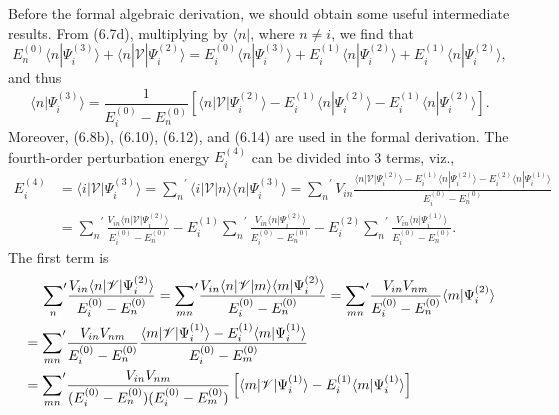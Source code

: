 \documentclass[a4paper]{book}
\newcounter{solution}[chapter]
\begin{document}
\begin{solution}
	Before the formal algebraic derivation, we should obtain some useful intermediate results. From (6.7d), multiplying by $\langle n |$, where $n \neq i$, we find that
	\[
		E^{(0)}_n \langle n | \Psi^{(3)}_i \rangle + \langle n | \mathscr{V} | \Psi^{(2)}_i \rangle = E^{(0)}_i \langle n | \Psi^{(3)}_i \rangle + E^{(1)}_i \langle n | \Psi^{(2)}_i \rangle + E^{(1)}_i \langle n | \Psi^{(2)}_i \rangle,
	\]
	and thus
	\[
		\langle n | \Psi^{(3)}_i \rangle = \frac{ 1 }{ E^{(0)}_i - E^{(0)}_n }\left[ \langle n | \mathscr{V} | \Psi^{(2)}_i \rangle - E^{(1)}_i \langle n | \Psi^{(2)}_i \rangle - E^{(1)}_i \langle n | \Psi^{(2)}_i \rangle \right].
	\]
	Moreover, (6.8b), (6.10), (6.12), and (6.14) are used in the formal derivation. The fourth-order perturbation energy $E^{(4)}_i$ can be divided into 3 terms, viz.,
	\begin{align*}
		E^{(4)}_i &= \langle i | \mathscr{V} | \Psi^{(3)}_i \rangle = { \sum_n }^\prime \langle i | \mathscr{V} | n \rangle \langle n | \Psi^{(3)}_i \rangle = { \sum_n }^\prime V_{in} \frac{ \langle n | \mathscr{V} | \Psi^{(2)}_i \rangle - E^{(1)}_i \langle n | \Psi^{(2)}_i \rangle - E^{(2)}_i \langle n | \Psi^{(1)}_i \rangle }{ E^{(0)}_i - E^{(0)}_n } \\
		&= { \sum_n }^\prime \frac{ V_{in} \langle n | \mathscr{V} | \Psi^{(2)}_i \rangle }{ E^{(0)}_i - E^{(0)}_n } - E^{(1)}_i { \sum_n }^\prime \frac{ V_{in} \langle n | \Psi^{(2)}_i \rangle }{ E^{(0)}_i - E^{(0)}_n } - E^{(2)}_i { \sum_n }^\prime \frac{ V_{in} \langle n | \Psi^{(1)}_i \rangle }{ E^{(0)}_i - E^{(0)}_n }.
	\end{align*}		
	The first term is
	\begin{align*}
		&\hspace{1.4em}{ \sum_n }^\prime \frac{ V_{in} \langle n | \mathscr{V} | \Psi^{(2)}_i \rangle }{ E^{(0)}_i - E^{(0)}_n } = { \sum_{mn} }^\prime \frac{ V_{in} \langle n | \mathscr{V} | m \rangle \langle m | \Psi^{(2)}_i \rangle }{ E^{(0)}_i - E^{(0)}_n } = { \sum_{mn} }^\prime \frac{ V_{in} V_{nm} }{ E^{(0)}_i - E^{(0)}_n } \langle m | \Psi^{(2)}_i \rangle \\
		&= { \sum_{mn} }^\prime \frac{ V_{in} V_{nm} }{ E^{(0)}_i - E^{(0)}_n } \frac{ \langle m | \mathscr{V} | \Psi^{(1)}_i \rangle - E^{(1)}_i \langle m | \Psi^{(1)}_i \rangle }{ E^{(0)}_i - E^{(0)}_m } \\
		&= { \sum_{mn} }^\prime \frac{ V_{in} V_{nm} }{ ( E^{(0)}_i - E^{(0)}_n )( E^{(0)}_i - E^{(0)}_m ) } \left[ \langle m | \mathscr{V} | \Psi^{(1)}_i \rangle - E^{(1)}_i \langle m | \Psi^{(1)}_i \rangle \right] \\

\end{align*}
\end{solution}
\end{document}
